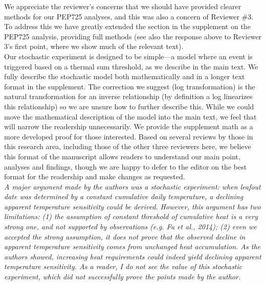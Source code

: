 \documentclass[11pt]{article}
\begin{document}
We appreciate the reviewer's concerns that we should have provided clearer methods for our PEP725 analyses, and this was also a concern of Reviewer \#3. To address this we have greatly extended the section in the supplement on the PEP725 analysis, providing full methods (see also the response above to Reviewer 3's first point, where we show much of the relevant text). \\

Our stochastic experiment is designed to be simple---a model where an event is triggered based on a thermal sum threshold, as we describe in the main text. We fully describe the stochastic model both mathematically and in a longer text format in the supplement. The correction we suggest (log transformation) is the natural transformation for an inverse relationship (by definition a log linearizes this relationship) so we are unsure how to further describe this. While we could move the mathematical description of the model into the main text, we feel that will narrow the readership unnecessarily. We provide the supplement math as a more developed proof for those interested. Based on several reviews by those in this research area, including those of the other three reviewers here, we believe this format of the manuscript allows readers to understand our main point, analyses and findings, though we are happy to defer to the editor on the best format for the readership and make changes as requested.\\

\emph{A major argument made by the authors was a stochastic experiment: when leafout date was determined by a constant cumulative daily temperature, a declining apparent temperature sensitivity could be derived. However, this argument has two limitations: (1) the assumption of constant threshold of cumulative heat is a very strong one, and not supported by observations (e.g. Fu et al., 2014); (2) even we accepted the strong assumption, it does not prove that the observed decline in apparent temperature sensitivity comes from unchanged heat accumulation. As the authors showed, increasing heat requirements could indeed yield declining apparent temperature sensitivity. As a reader, I do not see the value of this stochastic experiment, which did not successfully prove the points made by the author. }\\
\end{document}
